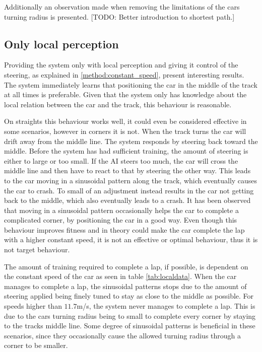 Additionally an observation made when removing the limitations of the cars turning radius is presented. [TODO: Better introduction to shortest path.]

\subsection{Only local perception}
\label{subsec:local_perception}
Providing the system only with local perception and giving it control of the steering, as explained in \ref{method:constant_speed}, present interesting results. The system immediately learns that positioning the car in the middle of the track at all times is preferable. Given that the system only has knowledge about the local relation between the car and the track, this behaviour is reasonable.

On straights this behaviour works well, it could even be considered effective in some scenarios, however in corners it is not. When the track turns the car will drift away from the middle line. The system responds by steering back toward the middle. Before the system has had sufficient training, the amount of steering is either to large or too small. If the AI steers too much, the car will cross the middle line and then have to react to that by steering the other way. This leads to the car moving in a sinusoidal pattern along the track, which eventually causes the car to crash. To small of an adjustment instead results in the car not getting back to the middle, which also eventually leads to a crash. It has been observed that moving in a sinusoidal pattern occasionally helps the car to complete a complicated corner, by positioning the car in a good way. Even though this behaviour improves fitness and in theory could make the car complete the lap with a higher constant speed, it is not an effective or optimal behaviour, thus it is not target behaviour.

The amount of training required to complete a lap, if possible, is dependent on the constant speed of the car as seen in table \ref{tab:localdata}. When the car manages to complete a lap, the sinusoidal patterns stops due to the amount of steering applied being finely tuned to stay as close to the middle as possible. For speeds higher than $11.7$m/s, the system never manages to complete a lap. This is due to the cars turning radius being to small to complete every corner by staying to the tracks middle line. Some degree of sinusoidal patterns is beneficial in these scenarios, since they occasionally cause the allowed turning radius through a corner to be smaller.

